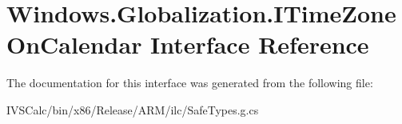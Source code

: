 \hypertarget{interface_windows_1_1_globalization_1_1_i_time_zone_on_calendar}{}\section{Windows.\+Globalization.\+I\+Time\+Zone\+On\+Calendar Interface Reference}
\label{interface_windows_1_1_globalization_1_1_i_time_zone_on_calendar}


The documentation for this interface was generated from the following file\+:\begin{DoxyCompactItemize}
\item 
I\+V\+S\+Calc/bin/x86/\+Release/\+A\+R\+M/ilc/Safe\+Types.\+g.\+cs\end{DoxyCompactItemize}
